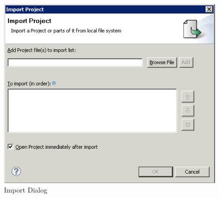 \begin{figure} [htbp]
\begin{center}
\includegraphics{Tasks/Projects/PS/Import}
\caption{Import Dialog}
\label{Import}
\end{center}
\end{figure}
